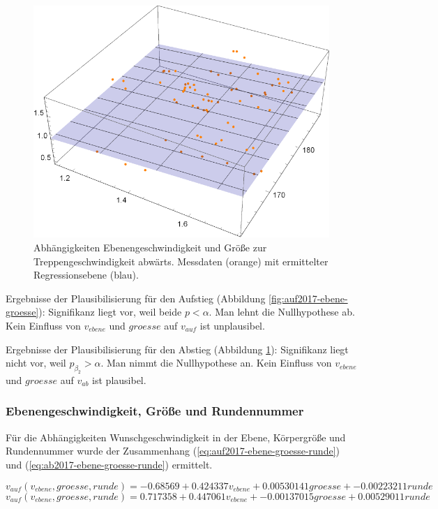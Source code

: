 \begin{figure} \centering 
	\includegraphics[]{abbildungen/regression/2017/ab-ebene-groesse.pdf}
	
	\caption{Abhängigkeiten Ebenengeschwindigkeit und Größe zur Treppengeschwindigkeit abwärts. Messdaten (orange) mit ermittelter Regressionsebene (blau). \label{fig:ab2017-ebene-groesse}}
\end{figure}

Ergebnisse der Plausibilisierung für den Aufstieg
(Abbildung \ref{fig:auf2017-ebene-groesse}):
Signifikanz liegt vor, weil beide $p < \alpha$. Man lehnt die
Nullhypothese ab. Kein Einfluss von $v_{ebene}$ und $groesse$ auf $v_{auf}$ ist unplausibel.

Ergebnisse der Plausibilisierung für den Abstieg
(Abbildung \ref{fig:ab2017-ebene-groesse}):
Signifikanz liegt nicht vor, weil $p_{\beta_2} > \alpha$. Man nimmt die
Nullhypothese an. Kein Einfluss von $v_{ebene}$ und $groesse$ auf $v_{ab}$ ist plausibel.


\subsubsection{Ebenengeschwindigkeit, Größe und Rundennummer}

Für die Abhängigkeiten Wunschgeschwindigkeit in der Ebene, Körpergröße und Rundennummer wurde 
der Zusammenhang (\ref{eq:auf2017-ebene-groesse-runde}) und (\ref{eq:ab2017-ebene-groesse-runde}) ermittelt.

\begin{equation} \label{eq:auf2017-ebene-groesse-runde}
v_{auf}(v_{ebene}, groesse, runde) = -0.68569 + 0.424337 v_{ebene} + 0.00530141 groesse + -0.00223211 runde
\end{equation}
\begin{equation} \label{eq:ab2017-ebene-groesse-runde}
v_{auf}(v_{ebene}, groesse, runde) = 0.717358 + 0.447061 v_{ebene} + -0.00137015 groesse + 0.00529011 runde
\end{equation}

